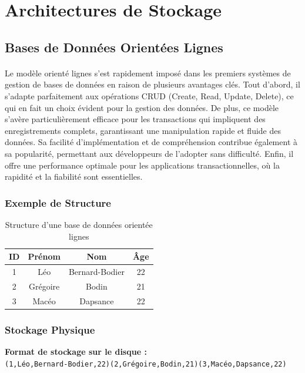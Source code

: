 \documentclass[11pt]{extarticle}
\begin{document}
\section{Architectures de Stockage}

\subsection{Bases de Données Orientées Lignes}
\paragraph{}
Le modèle orienté lignes s’est rapidement imposé dans les premiers systèmes de gestion de bases de données en raison de plusieurs avantages clés. Tout d’abord, il s’adapte parfaitement aux opérations CRUD (Create, Read, Update, Delete), ce qui en fait un choix évident pour la gestion des données. De plus, ce modèle s'avère particulièrement efficace pour les transactions qui impliquent des enregistrements complets, garantissant une manipulation rapide et fluide des données. Sa facilité d’implémentation et de compréhension contribue également à sa popularité, permettant aux développeurs de l’adopter sans difficulté. Enfin, il offre une performance optimale pour les applications transactionnelles, où la rapidité et la fiabilité sont essentielles.

\subsubsection{Exemple de Structure}
\begin{table}[H]
    \centering
    \begin{tabular}{|c|c|c|c|}
    \hline
    \textbf{ID} & \textbf{Prénom} & \textbf{Nom} & \textbf{Âge} \\
    \hline
    1 & Léo & Bernard-Bodier & 22 \\
    2 & Grégoire & Bodin & 21 \\
    3 & Macéo & Dapsance & 22 \\
    \hline
    \end{tabular}
    \caption{Structure d'une base de données orientée lignes}
    \label{tab:row_oriented}
\end{table}


\subsubsection{Stockage Physique}
\noindent\textbf{Format de stockage sur le disque :}\\
\texttt{(1,Léo,Bernard-Bodier,22)(2,Grégoire,Bodin,21)(3,Macéo,Dapsance,22)}
\end{document}
